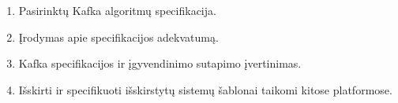 \documentclass{VUMIFPSmagistrinis}
\begin{document}
		\begin{enumerate}
			\item{Pasirinktų Kafka algoritmų specifikacija.}
			\item{Įrodymas apie specifikacijos adekvatumą.}
			\item{Kafka
 specifikacijos ir įgyvendinimo sutapimo įvertinimas.}
			\item{Išskirti ir specifikuoti išskirstytų sistemų šablonai taikomi kitose platformose.}
		\end{enumerate}
	\pagebreak
	\printbibliography[heading=bibintoc] 
\end{document}
